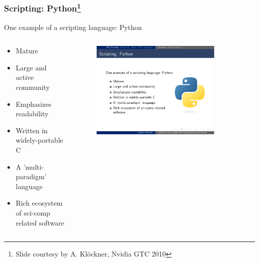 \documentclass[]{beamer}
\begin{document}
\begin{frame}

\end{frame}



\begin{frame}
\frametitle{Scripting: Python\footnote{Slide courtesy by A. Kl\"{o}ckner, Nvidia GTC 2010}}
One example of a scripting language: Python

\begin{columns}
    \begin{column}{.5\textwidth}
        \begin{itemize}
            \item Mature
            \item Large and active community
            \item Emphasizes readability
            \item Written in widely-portable C 
            \item A 'multi-paradigm' language
            \item Rich ecosystem of sci-comp related software
        \end{itemize}
    \end{column}
    \begin{column}{.5\textwidth}
        \begin{figure}
            \begin{minipage}{0.65\textwidth}
                \includegraphics[width=0.85\textwidth]{pics/python_logo}
            \end{minipage}
        \end{figure}   
    \end{column}
    \hspace*{-2cm}
\end{columns}
\end{frame}
\end{document}
